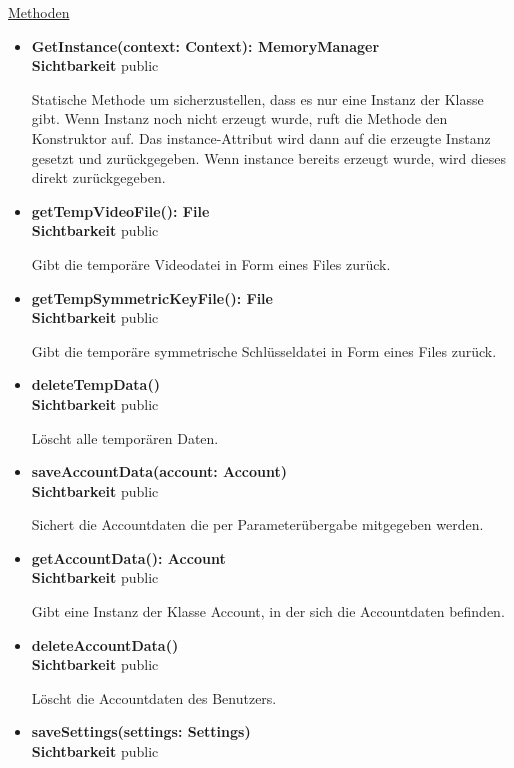 \underline{Methoden}
\begin{itemize}
\itemsep0pt

\item \textbf{GetInstance(context: Context): MemoryManager}\hfill\\
\textbf{Sichtbarkeit} public

Statische Methode um sicherzustellen, dass es nur eine Instanz der Klasse gibt. Wenn Instanz noch nicht erzeugt wurde, ruft die Methode den Konstruktor auf. Das instance-Attribut wird dann auf die erzeugte Instanz gesetzt und zurückgegeben. Wenn instance bereits erzeugt wurde, wird dieses direkt zurückgegeben.

\item \textbf{getTempVideoFile(): File}\hfill\\
\textbf{Sichtbarkeit} public

Gibt die temporäre Videodatei in Form eines Files zurück.

\item \textbf{getTempSymmetricKeyFile(): File}\hfill\\
\textbf{Sichtbarkeit} public

Gibt die temporäre symmetrische Schlüsseldatei in Form eines Files zurück.

\item \textbf{deleteTempData()}\hfill\\
\textbf{Sichtbarkeit} public

Löscht alle temporären Daten.

\item \textbf{saveAccountData(account: Account)}\hfill\\
\textbf{Sichtbarkeit} public

Sichert die Accountdaten die per Parameterübergabe mitgegeben werden.

\item \textbf{getAccountData(): Account}\hfill\\
\textbf{Sichtbarkeit} public

Gibt eine Instanz der Klasse Account, in der sich die Accountdaten befinden.

\item \textbf{deleteAccountData()}\hfill\\
\textbf{Sichtbarkeit} public

Löscht die Accountdaten des Benutzers.

\item \textbf{saveSettings(settings: Settings)}\hfill\\
\textbf{Sichtbarkeit} public


\end{itemize}
